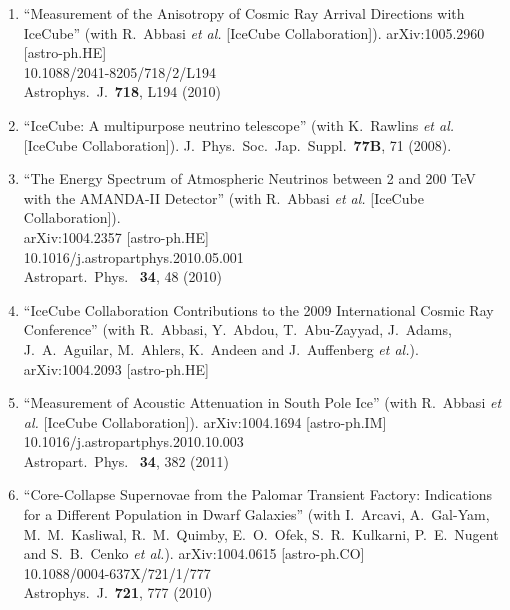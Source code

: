 \begin{enumerate}
\item ``Measurement of the Anisotropy of Cosmic Ray Arrival Directions with
  IceCube'' (with R.~Abbasi {\it et al.}  [IceCube Collaboration]). arXiv:1005.2960 [astro-ph.HE] \\{}10.1088/2041-8205/718/2/L194
  \\{}Astrophys.\ J.\ {\bf 718}, L194 (2010) %


\item ``IceCube: A multipurpose neutrino telescope'' (with K.~Rawlins {\it et
  al.}  [IceCube Collaboration]). J.\ Phys.\ Soc.\ Jap.\ Suppl.\ {\bf 77B}, 71 (2008). %


\item ``The Energy Spectrum of Atmospheric Neutrinos between 2 and 200 TeV
  with the AMANDA-II Detector'' (with R.~Abbasi {\it et al.}  [IceCube
    Collaboration]).  \\{}arXiv:1004.2357 [astro-ph.HE]
  \\{}10.1016/j.astropartphys.2010.05.001 \\{}Astropart.\ Phys.\ {\bf
    34}, 48 (2010) %


\item ``IceCube Collaboration Contributions to the 2009 International Cosmic
  Ray Conference'' (with R.~Abbasi, Y.~Abdou, T.~Abu-Zayyad, J.~Adams,
  J.~A.~Aguilar, M.~Ahlers, K.~Andeen and J.~Auffenberg {\it et al.}). arXiv:1004.2093 [astro-ph.HE]
  


\item ``Measurement of Acoustic Attenuation in South Pole Ice'' (with R.~Abbasi {\it et al.}  [IceCube Collaboration]). arXiv:1004.1694 [astro-ph.IM]
  \\{}10.1016/j.astropartphys.2010.10.003 \\{}Astropart.\ Phys.\ {\bf
    34}, 382 (2011) %


\item ``Core-Collapse Supernovae from the Palomar Transient Factory:
  Indications for a Different Population in Dwarf Galaxies'' (with I.~Arcavi, A.~Gal-Yam, M.~M.~Kasliwal, R.~M.~Quimby, E.~O.~Ofek,
  S.~R.~Kulkarni, P.~E.~Nugent and S.~B.~Cenko {\it et al.}). arXiv:1004.0615 [astro-ph.CO] \\{}10.1088/0004-637X/721/1/777
  \\{}Astrophys.\ J.\ {\bf 721}, 777 (2010) %



\end{enumerate}
